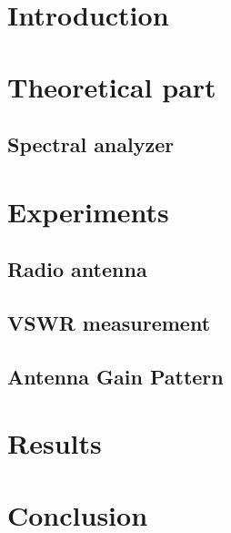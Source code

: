 \section{Introduction}



\section{Theoretical part}

\subsection{Spectral analyzer}




\section{Experiments}

\subsection{Radio antenna}





\subsection{VSWR measurement}



\subsection{Antenna Gain Pattern}




\section{Results}


\section{Conclusion}